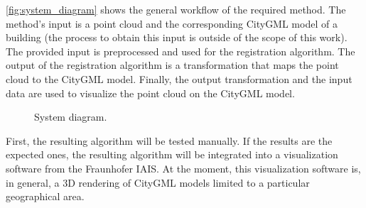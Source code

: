         \autoref{fig:system_diagram} shows the general workflow of the required method.
        The method’s input is a point cloud and the corresponding CityGML model of a building  
        (the process to obtain this input is outside of the scope of this work).
        The provided input is preprocessed and used for the registration algorithm.
        The output of the registration algorithm is a transformation that maps the point cloud to the CityGML model.
        Finally, the output transformation and the input data are used to visualize the point cloud on the CityGML model.

        \begin{figure}[htp]
            \centering
            
            \caption{System diagram.}
            \label{fig:system_diagram}
        \end{figure}

        First, the resulting algorithm will be tested manually. 
        If the results are the expected ones, the resulting algorithm will be integrated into a visualization software from the Fraunhofer IAIS. 
        At the moment, this visualization software is, in general, a 3D rendering of CityGML models limited to a particular geographical area.



